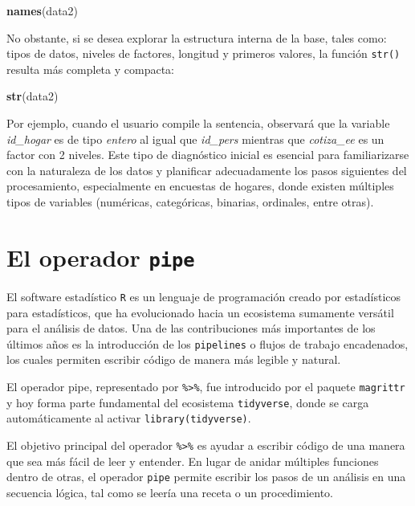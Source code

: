 \documentclass[
  spanish,
  12pt,
]{book}
\newenvironment{Shaded}{\begin{snugshade}}{\end{snugshade}}
\newcommand{\FunctionTok}[1]{\textcolor[rgb]{0.13,0.29,0.53}{\textbf{#1}}}
\newcommand{\NormalTok}[1]{#1}
\begin{document}
\begin{Shaded}
\begin{Highlighting}[]
\FunctionTok{names}\NormalTok{(data2)}
\end{Highlighting}
\end{Shaded}

No obstante, si se desea explorar la estructura interna de la base, tales como: tipos de datos, niveles de factores, longitud y primeros valores, la función \texttt{str()} resulta más completa y compacta:

\begin{Shaded}
\begin{Highlighting}[]
\FunctionTok{str}\NormalTok{(data2)}
\end{Highlighting}
\end{Shaded}

Por ejemplo, cuando el usuario compile la sentencia, observará que la variable \emph{id\_hogar} es de tipo \emph{entero} al igual que \emph{id\_pers} mientras que \emph{cotiza\_ee} es un factor con 2 niveles. Este tipo de diagnóstico inicial es esencial para familiarizarse con la naturaleza de los datos y planificar adecuadamente los pasos siguientes del procesamiento, especialmente en encuestas de hogares, donde existen múltiples tipos de variables (numéricas, categóricas, binarias, ordinales, entre otras).

\section{\texorpdfstring{El operador \texttt{pipe}}{El operador pipe}}\label{el-operador-pipe}

El software estadístico \texttt{R} es un lenguaje de programación creado por estadísticos para estadísticos, que ha evolucionado hacia un ecosistema sumamente versátil para el análisis de datos. Una de las contribuciones más importantes de los últimos años es la introducción de los \texttt{pipelines} o flujos de trabajo encadenados, los cuales permiten escribir código de manera más legible y natural.

El operador pipe, representado por \texttt{\%\textgreater{}\%}, fue introducido por el paquete \texttt{magrittr} \citep{pipe} y hoy forma parte fundamental del ecosistema \texttt{tidyverse}, donde se carga automáticamente al activar \texttt{library(tidyverse)}.

El objetivo principal del operador \texttt{\%\textgreater{}\%} es ayudar a escribir código de una manera que sea más fácil de leer y entender. En lugar de anidar múltiples funciones dentro de otras, el operador \texttt{pipe} permite escribir los pasos de un análisis en una secuencia lógica, tal como se leería una receta o un procedimiento.
\end{document}
